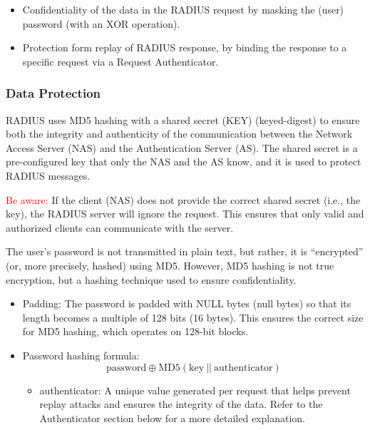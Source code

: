 \begin{itemize}
    \item Confidentiality of the data in the RADIUS request by masking the (user) password (with an XOR operation).
    \item Protection form replay of RADIUS response, by binding the response to a specific request via a Request Authenticator.
\end{itemize}

\subsubsection{Data Protection}
RADIUS uses MD5 hashing with a shared secret (KEY) (keyed-digest) to ensure both the integrity and authenticity of the communication between the Network Access Server (NAS) and the Authentication Server (AS). The shared secret is a pre-configured key that only the NAS and the AS know, and it is used to protect RADIUS messages.

\hfill

\textcolor{red}{Be aware:} If the client (NAS) does not provide the correct shared secret (i.e., the key), the RADIUS server will ignore the request. This ensures that only valid and authorized clients can communicate with the server.

\hfill 

The user’s password is not transmitted in plain text, but rather, it is “encrypted” (or, more precisely, hashed) using MD5. However, MD5 hashing is not true encryption, but a hashing technique used to ensure confidentiality.

\begin{itemize}
    \item Padding: The password is padded with NULL bytes (null bytes) so that its length becomes a multiple of 128 bits (16 bytes). This ensures the correct size for MD5 hashing, which operates on 128-bit blocks.
    \item Password hashing formula: 
    \begin{equation*}
        \text{password} \oplus \text{MD5}(\text{key}\ ||\ \text{authenticator})
    \end{equation*}
    \begin{itemize}
        \item authenticator: A unique value generated per request that helps prevent replay attacks and ensures the integrity of the data. Refer to the Authenticator section below for a more detailed explanation.
    \end{itemize}
\end{itemize}

